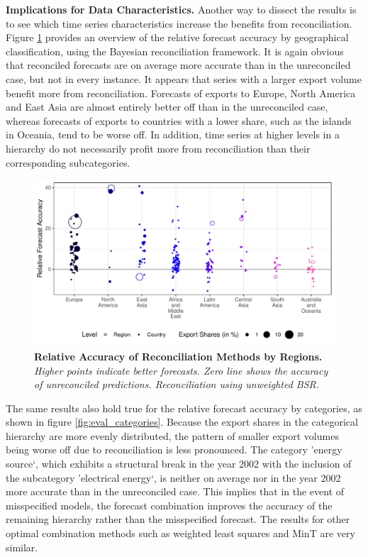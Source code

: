 \documentclass[a4paper,fleqn,11pt]{article}
\begin{document}
\noindent\textbf{Implications for Data Characteristics.} Another way to dissect the results is to see which time series characteristics increase the benefits from reconciliation. Figure \ref{fig:eval_regions} provides an overview of the relative forecast accuracy by geographical classification, using the Bayesian reconciliation framework. It is again obvious that reconciled forecasts are on average more accurate than in the unreconciled case, but not in every instance. It appears that series with a larger export volume benefit more from reconciliation. Forecasts of exports to Europe, North America and East Asia are almost entirely better off than in the unreconciled case, whereas forecasts of exports to countries with a lower share, such as the islands in Oceania, tend to be worse off. In addition, time series at higher levels in a hierarchy do not necessarily profit more from reconciliation than their corresponding subcategories.
 \begin{figure}[H]
	\includegraphics[width=\textwidth]{fig/fig_eval_regions}
	\caption[Relative Accuracy of Reconciliation Methods by Regions]{\textbf{Relative Accuracy of Reconciliation Methods by Regions.} \textit{Higher points indicate better forecasts. Zero line shows the accuracy of unreconciled predictions. Reconciliation using unweighted BSR.}}\label{fig:eval_regions}
\end{figure}
The same results also hold true for the relative forecast accuracy by categories, as shown in figure \ref{fig:eval_categories}. Because the export shares in the categorical hierarchy are more evenly distributed, the pattern of smaller export volumes being worse off due to reconciliation is less pronounced. The category 'energy source`, which exhibits a structural break in the year 2002 with the inclusion of the subcategory 'electrical energy`, is neither on average nor in the year 2002 more accurate than in the unreconciled case. This implies that in the event of misspecified models, the forecast combination improves the accuracy of the remaining hierarchy rather than the misspecified forecast. The results for other optimal combination methods such as weighted least squares and MinT are very similar.
\end{document}
